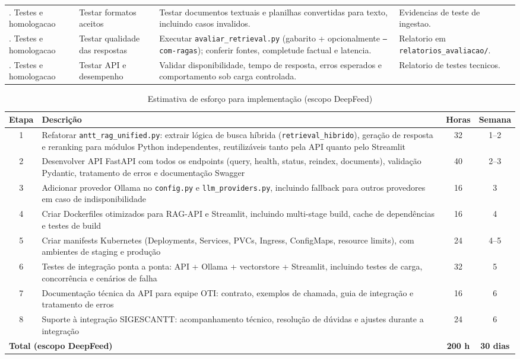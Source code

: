 \documentclass[12pt, a4paper]{article}
\begin{document}
\begin{table}[H]
\begin{tabularx}{\textwidth}{>{\raggedright\arraybackslash}p{2.3cm} >{\raggedright\arraybackslash}p{2.6cm} X X}
6. Testes e homologacao & 6.1 Testar formatos aceitos & Testar documentos textuais e planilhas convertidas para texto, incluindo casos invalidos. & Evidencias de teste de ingestao. \\
6. Testes e homologacao & 6.2 Testar qualidade das respostas & Executar \texttt{avaliar\_retrieval.py} (gabarito + opcionalmente \texttt{--com-ragas}); conferir fontes, completude factual e latencia. & Relatorio em \texttt{relatorios\_avaliacao/}. \\
6. Testes e homologacao & 6.3 Testar API e desempenho & Validar disponibilidade, tempo de resposta, erros esperados e comportamento sob carga controlada. & Relatorio de testes tecnicos. \\
\bottomrule
\end{tabularx}
\end{table}

\begin{table}[H]
\centering
\small
\caption{Estimativa de esforço para implementação (escopo DeepFeed)}
\label{tab:esforco}
\begin{tabularx}{\textwidth}{c X c c}
\toprule
\textbf{Etapa} & \textbf{Descrição} & \textbf{Horas} & \textbf{Semana} \\
\midrule
1 & Refatorar \texttt{antt\_rag\_unified.py}: extrair lógica de busca híbrida (\texttt{retrieval\_hibrido}), geração de resposta e reranking para módulos Python independentes, reutilizáveis tanto pela API quanto pelo Streamlit & 32 & 1--2 \\
2 & Desenvolver API FastAPI com todos os endpoints (query, health, status, reindex, documents), validação Pydantic, tratamento de erros e documentação Swagger & 40 & 2--3 \\
3 & Adicionar provedor Ollama no \texttt{config.py} e \texttt{llm\_providers.py}, incluindo fallback para outros provedores em caso de indisponibilidade & 16 & 3 \\
4 & Criar Dockerfiles otimizados para RAG-API e Streamlit, incluindo multi-stage build, cache de dependências e testes de build & 16 & 4 \\
5 & Criar manifests Kubernetes (Deployments, Services, PVCs, Ingress, ConfigMaps, resource limits), com ambientes de staging e produção & 24 & 4--5 \\
6 & Testes de integração ponta a ponta: API + Ollama + vectorstore + Streamlit, incluindo testes de carga, concorrência e cenários de falha & 32 & 5 \\
7 & Documentação técnica da API para equipe OTI: contrato, exemplos de chamada, guia de integração e tratamento de erros & 16 & 6 \\
8 & Suporte à integração SIGESCANTT: acompanhamento técnico, resolução de dúvidas e ajustes durante a integração & 24 & 6 \\
\midrule
\multicolumn{2}{l}{\textbf{Total (escopo DeepFeed)}} & \textbf{200 h} & \textbf{30 dias} \\
\bottomrule
\end{tabularx}
\end{table}
\end{document}
